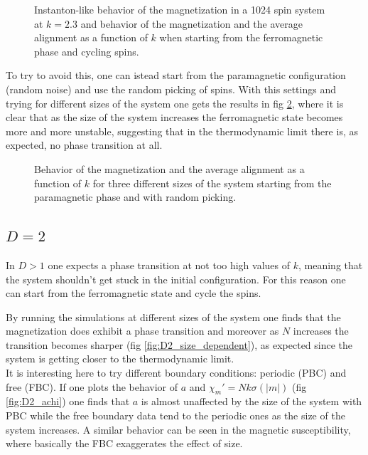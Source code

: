 \documentclass[a4paper, 11pt]{article}
\begin{document}
      \begin{figure}[H]
        \centering
        \caption{Instanton-like behavior of the magnetization in a 1024 spin system at $k = 2.3$ and behavior of the magnetization and the average alignment as a function of $k$ when starting from the ferromagnetic phase and cycling spins.}
        \label{fig:instanton}
      \end{figure}

      To try to avoid this, one can istead start from the paramagnetic configuration (random noise) and use the random picking of spins. With this settings and trying for different sizes of the system one gets the results in fig \ref{fig:D1_size_dependent}, where it is clear that as the size of the system increases the ferromagnetic state becomes more and more unstable, suggesting that in the thermodynamic limit there is, as expected, no phase transition at all.

      \begin{figure}[H]
        \centering
        \caption{Behavior of the magnetization and the average alignment as a function of $k$ for three different sizes of the system starting from the paramagnetic phase and with random picking.}
        \label{fig:D1_size_dependent}
      \end{figure}


    \subsection{$D = 2$}
      In $D > 1$ one expects a phase transition at not too high values of $k$, meaning that the system shouldn't get stuck in the initial configuration. For this reason one can start from the ferromagnetic state and cycle the spins.

      By running the simulations at different sizes of the system one finds that the magnetization does exhibit a phase transition and moreover as $N$ increases the transition becomes sharper (fig \ref{fig:D2_size_dependent}), as expected since the system is getting closer to the thermodynamic limit.\\
      It is interesting here to try different boundary conditions: periodic (PBC) and free (FBC).
      If one plots the behavior of $a$ and $\chi_m' = Nk\sigma(|m|)$ (fig \ref{fig:D2_achi}) one finds that $a$ is almost unaffected by the size of the system with PBC while the free boundary data tend to the periodic ones as the size of the system increases. A similar behavior can be seen in the magnetic susceptibility, where basically the FBC exaggerates the effect of size.
\end{document}
